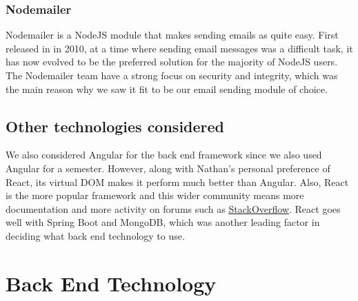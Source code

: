 \subsubsection{Nodemailer}
Nodemailer is a NodeJS module that makes sending emails as quite easy. First released in in 2010, at a time where sending email messages was a difficult task, it has now evolved to be the preferred solution for the majority of NodeJS users.
The Nodemailer team have a strong focus on security and integrity, which was the main reason why we saw it fit to be our email sending module of choice.

\subsection{Other technologies considered}
We also considered Angular for the back end framework since we also used Angular for a semester. However, along with Nathan's personal preference of React, its virtual DOM makes it perform much better than Angular. Also, React is the more popular framework and this wider community means more documentation and more activity on forums such as \underline{\href{https://stackoverflow.com}{StackOverflow}}. React goes well with Spring Boot and MongoDB, which was another leading factor in deciding what back end technology to use.  \par

\section{Back End Technology}

